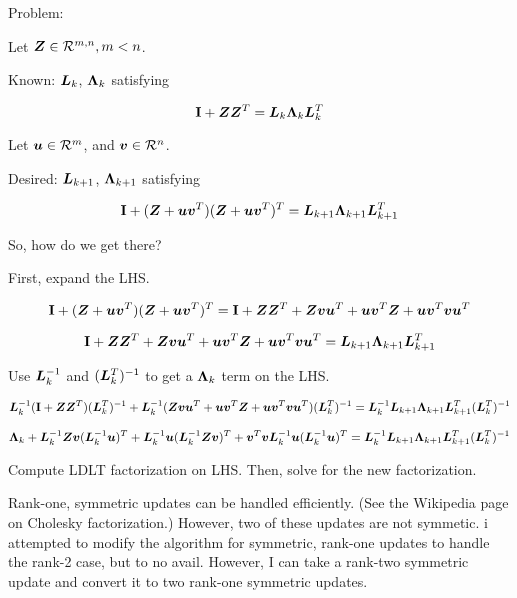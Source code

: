 \documentclass{article}
\begin{document}
Problem:

Let $\bm{Z} \in \mathcal{R}^{m,n}, m < n$.

Known: $\bm{L}_k$, $\bm{\Lambda}_k$ satisfying

\begin{equation}
{\bf I} + \bm{Z}\bm{Z}^T = \bm{L}_k\bm{\Lambda}_k\bm{L}_k^T
\end{equation}

Let $\bm{u} \in \mathcal{R}^m$, and $\bm{v} \in \mathcal{R}^n$.

Desired: $\bm{L}_{k + 1}$, $\bm{\Lambda}_{k + 1}$ satisfying

\begin{equation}
{\bf I} + (\bm{Z} + \bm{u}\bm{v}^T)(\bm{Z} + \bm{u}\bm{v}^T)^T = \bm{L}_{k + 1}\bm{\Lambda}_{k + 1}\bm{L}_{k + 1}^T
\end{equation}


So, how do we get there?

First, expand the LHS.

\begin{equation}
{\bf I} + (\bm{Z} + \bm{u}\bm{v}^T)(\bm{Z} + \bm{u}\bm{v}^T)^T = {\bf I} + \bm{Z}\bm{Z}^T + \bm{Z}\bm{v}\bm{u}^T + \bm{u}\bm{v}^T\bm{Z} + \bm{u}\bm{v}^T\bm{v}\bm{u}^T
\end{equation}

\begin{equation}
{\bf I} + \bm{Z}\bm{Z}^T + \bm{Z}\bm{v}\bm{u}^T + \bm{u}\bm{v}^T\bm{Z} + \bm{u}\bm{v}^T\bm{v}\bm{u}^T = \bm{L}_{k + 1}\bm{\Lambda}_{k + 1}\bm{L}_{k + 1}^T
\end{equation}

Use $\bm{L}_k^{-1}$ and $(\bm{L}_k^T)^{-1}$ to get a $\bm{\Lambda}_k$ term on the LHS.

\begin{equation}
\bm{L}_k^{-1}({\bf I} + \bm{Z}\bm{Z}^T)(\bm{L}_k^T)^{-1} + \bm{L}_k^{-1}(\bm{Z}\bm{v}\bm{u}^T + \bm{u}\bm{v}^T\bm{Z} + \bm{u}\bm{v}^T\bm{v}\bm{u}^T)(\bm{L}_k^T)^{-1} = \bm{L}_{k}^{-1}\bm{L}_{k + 1}\bm{\Lambda}_{k + 1}\bm{L}_{k + 1}^T(\bm{L}_k^T)^{-1}
\end{equation}

\begin{equation}
\bm{\Lambda}_k + \bm{L}_k^{-1}\bm{Z}\bm{v}(\bm{L}_k^{-1}\bm{u})^T + \bm{L}_k^{-1}\bm{u}(\bm{L}_k^{-1}\bm{Z}\bm{v})^T + \bm{v}^T\bm{v}\bm{L}_k^{-1}\bm{u}(\bm{L}_k^{-1}\bm{u})^T = \bm{L}_{k}^{-1}\bm{L}_{k + 1}\bm{\Lambda}_{k + 1}\bm{L}_{k + 1}^T(\bm{L}_k^T)^{-1}
\end{equation}

Compute LDLT factorization on LHS. Then, solve for the new factorization.

Rank-one, symmetric updates can be handled efficiently.  (See the Wikipedia page on Cholesky factorization.)  However, two of these updates are not symmetic. i attempted to modify the algorithm for symmetric, rank-one updates to handle the rank-2 case, but to no avail. However, I can take a rank-two symmetric update and convert it to two rank-one symmetric updates.
\end{document}
